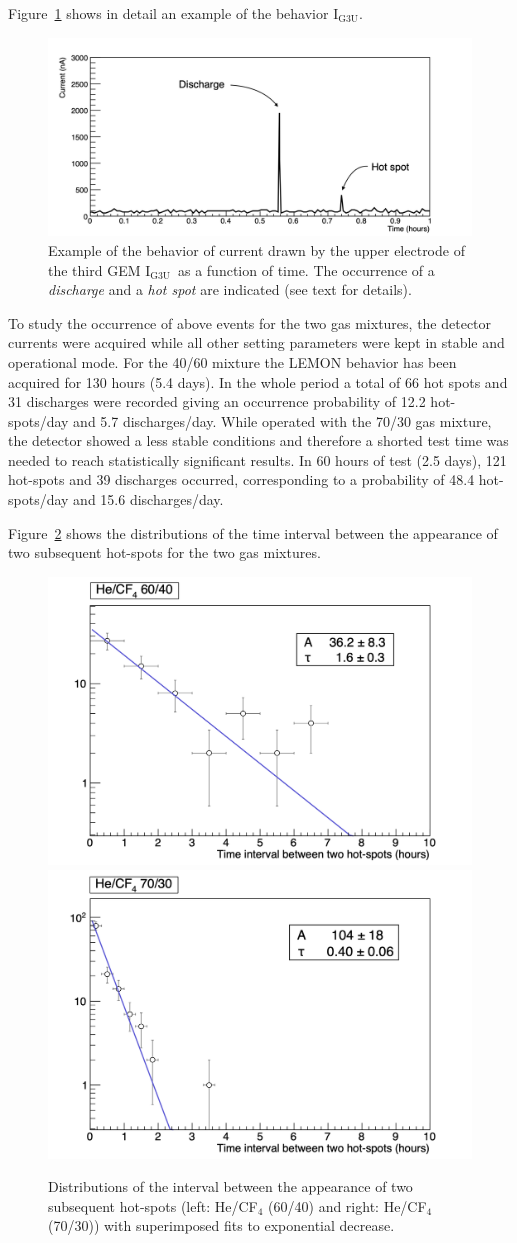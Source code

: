 \documentclass[a4paper,11pt]{article}
\newcommand{\Ig}  {I$_{\mathrm{G3U}}$}
\begin{document}
Figure~\ref{fig:g3up_ex} shows in detail an example of the behavior \Ig. 

\begin{figure}[ht]
	\centering
	\includegraphics[width=0.69\linewidth]{Figures/c2_hot_discharge.png}
  	\caption{Example of the behavior of current drawn by the upper electrode of the third GEM \Ig\ as a function of time. The occurrence of a {\it discharge} and a {\it hot spot} are indicated (see text for details).}
  	\label{fig:g3up_ex}
\end{figure}


To study the occurrence of above events for the two gas mixtures, the detector currents were acquired while all other setting parameters were kept in stable and operational mode. 
For the 40/60 mixture the LEMON behavior has been acquired for 130 hours (5.4 days). In the whole period a total of 66 hot spots and 31 discharges were recorded giving an occurrence probability of 12.2 hot-spots/day and 5.7 discharges/day.
While operated with the 70/30 gas mixture, the detector showed a less stable conditions and therefore a shorted test time was needed to reach statistically significant results. In 60 hours of test (2.5 days), 121 hot-spots and 39 discharges occurred, corresponding to a probability of 48.4 hot-spots/day and 15.6 discharges/day.

Figure~\ref{fig:hDist} shows the distributions of the time interval between the appearance of two subsequent hot-spots for the two gas mixtures.

\begin{figure}[ht]
	\centering
	\includegraphics[width=0.45\linewidth]{Figures/hDistHot_6040.png}
	\includegraphics[width=0.45\linewidth]{Figures/hDistHot_7030.png}
  	\caption{Distributions of the interval between the appearance of two subsequent hot-spots (left: He/CF$_4$ (60/40) and right: He/CF$_4$ (70/30)) with superimposed fits to exponential decrease.}
  	\label{fig:hDist}
\end{figure}
\end{document}
